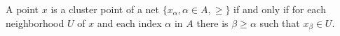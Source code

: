 A point $x$ is a cluster point of a net $\{x_\alpha, \alpha \in A, \geq\}$ if and only if for each neighborhood $U$ of $x$ and each index $\alpha$ in $A$ there is $\beta \geq \alpha$ such that $x_\beta \in U$.
